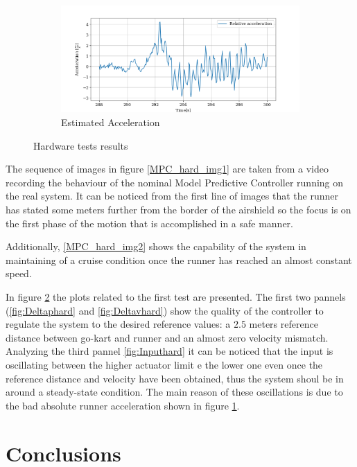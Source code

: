 \documentclass[a4paper,12pt,oneside]{book}
\begin{document}
\begin{figure}[h!]
    \begin{subfigure}[t]{0.7\textwidth}
        \includegraphics[width=\textwidth]{Hardware_test/Acceleration.png}
        \caption{Estimated Acceleration}
        \label{fig:Est_acc}
    \end{subfigure}
    \caption{Hardware tests results}
    \label{fig:Hardware_Test}
\end{figure}

The sequence of images in figure \ref{MPC_hard_img1} are taken from a video recording the behaviour of the nominal Model Predictive Controller running on the real system.
It can be noticed from the first line of images that the runner has stated some meters further from the border of the airshield so the focus is on the first phase of the motion that is accomplished in a safe manner.

Additionally, \ref{MPC_hard_img2} shows the capability of the system in maintaining of a cruise condition once the runner has reached an almost constant speed.

In figure \ref{fig:Hardware_Test} the plots related to the first test are presented.
The first two pannels (\ref{fig:Deltaphard} and \ref{fig:Deltavhard}) show the quality of the controller to regulate the system to the desired reference values: a $2.5$ meters reference distance between go-kart and runner and an almost zero velocity mismatch.
Analyzing the third pannel \ref{fig:Inputhard} it can be noticed that the input is oscillating between the higher actuator limit e the lower one even once the reference distance and velocity have been obtained, thus the system shoul be in around a steady-state condition.
The main reason of these oscillations is due to the bad absolute runner acceleration shown in figure \ref{fig:Est_acc}.


\chapter*{Conclusions}

	  
	





\printbibliography


\end{document}
